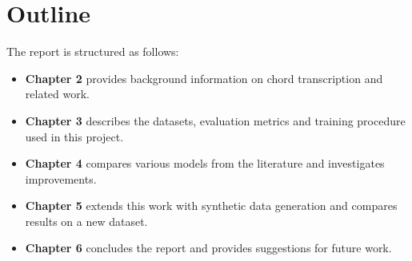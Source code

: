 \section{Outline}

The report is structured as follows:

\begin{itemize}
    \item \textbf{Chapter 2} provides background information on chord transcription and related work.
    \item \textbf{Chapter 3} describes the datasets, evaluation metrics and training procedure used in this project.
    \item \textbf{Chapter 4} compares various models from the literature and investigates improvements.
    \item \textbf{Chapter 5} extends this work with synthetic data generation and compares results on a new dataset.
    \item \textbf{Chapter 6} concludes the report and provides suggestions for future work.
\end{itemize}